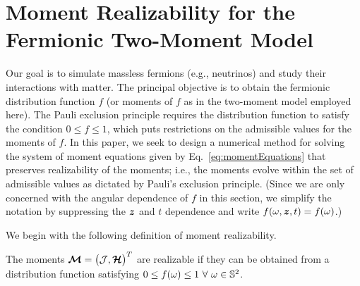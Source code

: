 \section{Moment Realizability for the Fermionic Two-Moment Model}
\label{sec:realizability}

Our goal is to simulate massless fermions (e.g., neutrinos) and study their interactions with matter.  
The principal objective is to obtain the fermionic distribution function $f$ (or moments of $f$ as in the two-moment model employed here).  
The Pauli exclusion principle requires the distribution function to satisfy the condition $0 \le f \le 1$, which puts restrictions on the admissible values for the moments of $f$.  
In this paper, we seek to design a numerical method for solving the system of moment equations given by Eq.~\eqref{eq:momentEquations} that preserves realizability of the moments; i.e., the moments evolve within the set of admissible values as dictated by Pauli's exclusion principle.  
(Since we are only concerned with the angular dependence of $f$ in this section, we simplify the notation by suppressing the $\boldsymbol{z}$ and $t$ dependence and write $f(\omega,\boldsymbol{z},t)=f(\omega)$.)  

We begin with the following definition of moment realizability.  
\begin{define}
  The moments $\boldsymbol{\mathcal{M}}=\big(\mathcal{J},\boldsymbol{\mathcal{H}}\big)^{T}$ are realizable if they can be obtained from a distribution function satisfying $0\le f(\omega) \le 1~\forall~\omega\in\mathbb{S}^{2}$.
\end{define}

